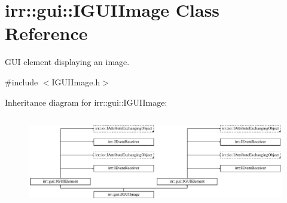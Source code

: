 \hypertarget{classirr_1_1gui_1_1IGUIImage}{}\section{irr\+:\+:gui\+:\+:I\+G\+U\+I\+Image Class Reference}
\label{classirr_1_1gui_1_1IGUIImage}


G\+UI element displaying an image.  




{\ttfamily \#include $<$I\+G\+U\+I\+Image.\+h$>$}

Inheritance diagram for irr\+:\+:gui\+:\+:I\+G\+U\+I\+Image\+:\begin{figure}[H]
\begin{center}
\leavevmode
\includegraphics[height=4.038462cm]{classirr_1_1gui_1_1IGUIImage}
\end{center}
\end{figure}
